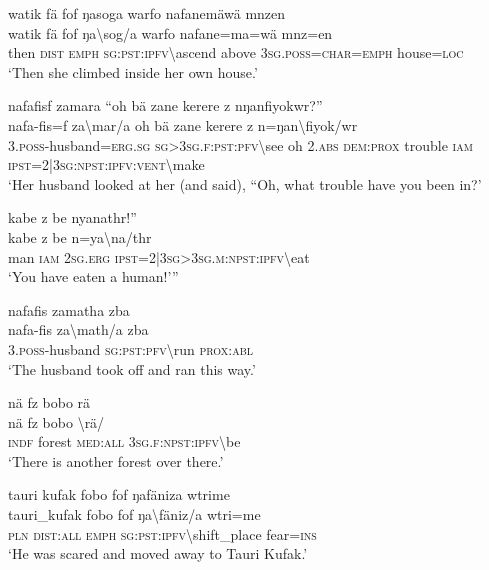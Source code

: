 \ea\label{ex:6:a1296}
watik fä fof ŋasoga warfo nafanemäwä mnzen\\
\gll watik	fä	fof	ŋa{\textbackslash}sog/a	warfo	nafane=ma=wä	mnz=en\\
     then	\textsc{dist}	\textsc{emph}	\textsc{sg}:\textsc{pst}:\textsc{ipfv}{\textbackslash}ascend	above	3\textsc{sg}.\textsc{poss}=\textsc{char}=\textsc{emph}	house=\textsc{loc}\\
\glt `Then she climbed inside her own house.'
\z

\ea\label{ex:6:a1297}
nafafisf zamara ``oh bä zane kerere z nŋanfiyokwr?''\\
\gll nafa-fis=f	za{\textbackslash}mar/a	oh	bä	zane	kerere	z	n=ŋan{\textbackslash}fiyok/wr\\
     3.\textsc{poss}-husband=\textsc{erg}.\textsc{sg}	\textsc{sg}>3\textsc{sg}.\textsc{f}:\textsc{pst}:\textsc{pfv}{\textbackslash}see	oh	2.\textsc{abs}	\textsc{dem}:\textsc{prox}	trouble	\textsc{iam}	\textsc{ipst}=2|3\textsc{sg}:\textsc{npst}:\textsc{ipfv}:\textsc{vent}{\textbackslash}make\\
\glt `Her husband looked at her (and said), ``Oh, what trouble have you been in?'
\z

\ea\label{ex:6:a1298}
kabe z be nyanathr!''\\
\gll kabe	z	be	n=ya{\textbackslash}na/thr\\
     man	\textsc{iam}	2\textsc{sg}.\textsc{erg}	\textsc{ipst}=2|3\textsc{sg}>3\textsc{sg}.\textsc{m}:\textsc{npst}:\textsc{ipfv}{\textbackslash}eat\\
\glt `You have eaten a human!'''
\z

\ea\label{ex:6:a1299}
nafafis zamatha zba\\
\gll nafa-fis	za{\textbackslash}math/a	zba\\
     3.\textsc{poss}-husband	\textsc{sg}:\textsc{pst}:\textsc{pfv}{\textbackslash}run	\textsc{prox}:\textsc{abl}\\
\glt `The husband took off and ran this way.'
\z

\ea\label{ex:6:a1301}
nä fz bobo rä\\
\gll nä	fz	bobo	{\textbackslash}rä/\\
     \textsc{indf}	forest	\textsc{med}:\textsc{all}	3\textsc{sg}.\textsc{f}:\textsc{npst}:\textsc{ipfv}{\textbackslash}be\\
\glt `There is another forest over there.'
\z

\ea\label{ex:6:a1302}
tauri kufak fobo fof ŋafäniza wtrime\\
\gll tauri\_kufak	fobo	fof	ŋa{\textbackslash}fäniz/a	wtri=me\\
     \textsc{pln}	\textsc{dist}:\textsc{all}	\textsc{emph}	\textsc{sg}:\textsc{pst}:\textsc{ipfv}{\textbackslash}shift\_place	fear=\textsc{ins}\\
\glt `He was scared and moved away to Tauri Kufak.'
\z

